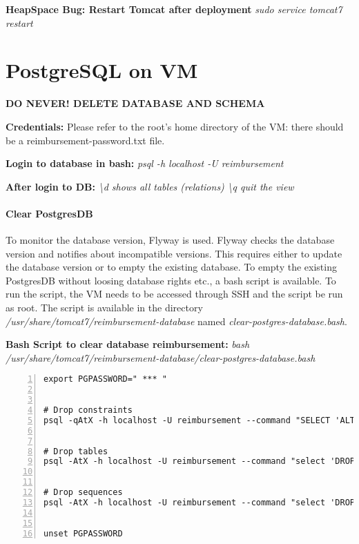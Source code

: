 \textbf{HeapSpace Bug: Restart Tomcat after deployment}\newline
\textit{sudo service tomcat7 restart}

\section{PostgreSQL on VM}
\label{sec:postgresOnVM}
\textbf{DO NEVER! DELETE DATABASE AND SCHEMA}

\textbf{Credentials:}\newline
Please refer to the root's home directory of the VM: there should be a reimbursement-password.txt file.


\textbf{Login to database in bash:}\newline
\textit{psql -h localhost -U reimbursement}


\textbf{After login to DB:}\newline
\textit{\textbackslash d   shows all tables (relations)}\newline
\textit{\textbackslash q   quit the view}

\paragraph{Clear PostgresDB}
\label{sec:clear-postgresdb}
To monitor the database version, Flyway is used. Flyway checks the database version and notifies about incompatible versions. This requires either to update the database version or to empty the existing database. To empty the existing PostgresDB without loosing database rights etc., a bash script is available. To run the script, the VM needs to be accessed through SSH and the script be run as root. The script is available in the directory \textit{/usr/share/tomcat7/reimbursement-database} named \textit{clear-postgres-database.bash}.

\textbf{Bash Script to clear database reimbursement:}\newline
\textit{bash /usr/share/tomcat7/reimbursement-database/clear-postgres-database.bash}

\begin{lstlisting}[numbers=left, breaklines=true]
export PGPASSWORD=" *** "


# Drop constraints
psql -qAtX -h localhost -U reimbursement --command "SELECT 'ALTER TABLE '||table_name||' DROP CONSTRAINT '||constraint_name||';' FROM information_schema.constraint_table_usage;" | psql -h localhost -U reimbursement -qAtX


# Drop tables
psql -AtX -h localhost -U reimbursement --command "select 'DROP TABLE IF EXISTS ' || quote_ident(table_schema) || '.' || quote_ident(table_name) || ' CASCADE;' FROM information_schema.tables where table_type = 'BASE TABLE' and not table_schema ~ '^(information_schema|pg_.*)$';" | psql -h localhost -U reimbursement -AtX


# Drop sequences
psql -AtX -h localhost -U reimbursement --command "select 'DROP SEQUENCE IF EXISTS ' || quote_ident(relname) || ' CASCADE;' from pg_statio_user_sequences;" | psql -h localhost -U reimbursement -AtX


unset PGPASSWORD
\end{lstlisting}


